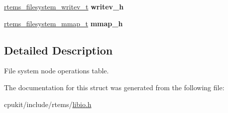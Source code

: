\begin{DoxyCompactItemize}
\item 
\mbox{\label{struct__rtems__filesystem__file__handlers__r_a0f237b75dedab149af3abe6b59933b5c}} 
\mbox{\hyperlink{group__LibIOFSHandler_gabdb95b0ef5e3875f0b80cc221edf78f8}{rtems\+\_\+filesystem\+\_\+writev\+\_\+t}} {\bfseries writev\+\_\+h}
\item 
\mbox{\label{struct__rtems__filesystem__file__handlers__r_a740a2741b382dada1e3688b742180035}} 
\mbox{\hyperlink{group__LibIOFSHandler_gadfd939c2b1e61acd15671a288a259e96}{rtems\+\_\+filesystem\+\_\+mmap\+\_\+t}} {\bfseries mmap\+\_\+h}
\end{DoxyCompactItemize}


\subsection{Detailed Description}
File system node operations table. 

The documentation for this struct was generated from the following file\+:\begin{DoxyCompactItemize}
\item 
cpukit/include/rtems/\mbox{\hyperlink{libio_8h}{libio.\+h}}\end{DoxyCompactItemize}

